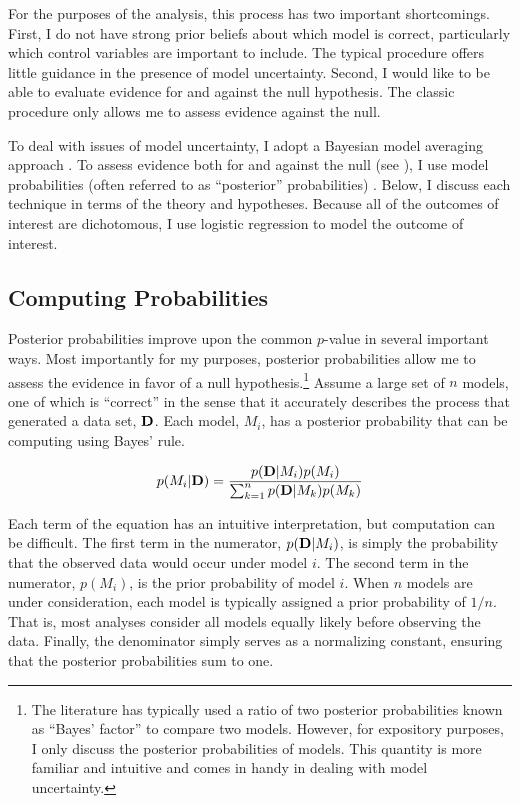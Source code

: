 \documentclass[12pt]{article}
\begin{document}
For the purposes of the analysis, this process has two important shortcomings. First, I do not have strong prior beliefs about which model is correct, particularly which control variables are important to include. The typical procedure offers little guidance in the presence of model uncertainty. Second, I would like to be able to evaluate evidence for and against the null hypothesis. The classic procedure only allows me to assess evidence against the null. 

To deal with issues of model uncertainty, I adopt a Bayesian model averaging approach \citep{Raftery1995, MontgomeryNyhan2010}. To assess evidence both for and against the null (see \citealt{Gill1999}), I use model probabilities (often referred to as ``posterior'' probabilities) \citep{Jackman2004, Gill2008, Jackman2009}. Below, I discuss each technique in terms of the theory and hypotheses. Because all of the outcomes of interest are dichotomous, I use logistic regression to model the outcome of interest.

\subsection*{Computing Probabilities}

Posterior probabilities improve upon the common $p$-value in several important ways. Most importantly for my purposes, posterior probabilities allow me to assess the evidence in favor of a null hypothesis.\footnote{The literature has typically used a ratio of two posterior probabilities known as ``Bayes' factor'' to compare two models. However, for expository purposes, I only discuss the posterior probabilities of models. This quantity is more familiar and intuitive and comes in handy in dealing with model uncertainty.} Assume a large set of $n$ models, one of which is ``correct'' in the sense that it accurately describes the process that generated a data set, ${\bf D}$. Each model, $M_i$, has a posterior probability that can be computing using Bayes' rule.

\begin{equation}
p(M_i | {\bf D}) = \dfrac{p({\bf D} | M_i)p(M_i)}{\sum_{k=1}^{n}p({\bf D} | M_k)p(M_k)}\label{eqn:PostProb}
\end{equation}

Each term of the equation has an intuitive interpretation, but computation can be difficult. The first term in the numerator, $p({\bf D} | M_i)$, is simply the probability that the observed data would occur under model $i$. The second term in the numerator, $p(M_i)$, is the prior probability of model $i$. When $n$ models are under consideration, each model is typically assigned a prior probability of $1/n$. That is, most analyses consider all models equally likely before observing the data. Finally, the denominator simply serves as a normalizing constant, ensuring that the posterior probabilities sum to one. 
\end{document}
